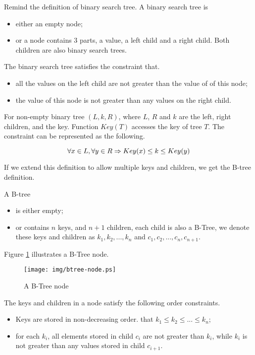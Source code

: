 \documentclass{article}
\begin{document}
Remind the definition of binary search tree. A binary search tree is
\begin{itemize}
\item either an empty node;
\item or a node contains 3 parts, a value, a left child and a right child.
Both children are also binary search trees.
\end{itemize}

The binary search tree satisfies the constraint that.
\begin{itemize}
\item all the values on the left child are not greater than the value of of this node;
\item the value of this node is not greater than any values on the right child.
\end{itemize}

For non-empty binary tree $(L, k, R)$, where $L$, $R$ and $k$
are the left, right children, and the key. Function $Key(T)$ accesses
the key of tree $T$.
The constraint can be represented as the following.

\begin{equation}
\forall x \in L, \forall y \in R \\
\Rightarrow Key(x) \leq k \leq Key(y)
\end{equation}

If we extend this definition to allow multiple keys and children, we get the
B-tree definition.

A B-tree
\begin{itemize}
\item is either empty;
\item or contains $n$ keys, and $n+1$ children, each child is
also a B-Tree, we denote these keys and children as $k_1, k_2, ..., k_n$
and $c_1, c_2, ..., c_n, c_{n+1}$.
\end{itemize}

Figure \ref{fig:btree-node} illustrates a B-Tree node.

\begin{figure}[htbp]
  \centering
	\texttt{[image: img/btree-node.ps]}
  \caption{A B-Tree node} \label{fig:btree-node}
\end{figure}

The keys and children in a node satisfy the following order constraints.

\begin{itemize}
\item Keys are stored in non-decreasing order. that $k_1 \leq k_2 \leq ... \leq k_n$;
\item for each $k_i$, all elements stored in child $c_i$ are not greater
than $k_i$, while $k_i$ is not greater than any values stored in child $c_{i+1}$.
\end{itemize}
\end{document}
